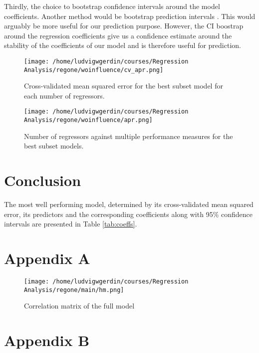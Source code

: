\documentclass[11pt]{article}
\begin{document}
Thirdly, the choice to bootstrap confidence intervals around the model coefficients. Another method 
would be bootstrap prediction intervals \cite{davison_hinkley_1997}. This 
would arguably be more useful for our prediction purpose. However, the CI boostrap around the regression 
coefficients give us a confidence estimate around the stability of the coefficients of our model and is
therefore useful for prediction.



\begin{figure}[htbp]
\centering
\texttt{[image: /home/ludvigwgerdin/courses/Regression Analysis/regone/woinfluence/cv\_apr.png]}
\caption{\label{fig:org419f46d}
Cross-validated mean squared error for the best subset model for each number of regressors.}
\end{figure}

\begin{figure}[htbp]
\centering
\texttt{[image: /home/ludvigwgerdin/courses/Regression Analysis/regone/woinfluence/apr.png]}
\caption{\label{fig:org04b25ee}
Number of regressors against multiple performance measures for the best subset models.}
\end{figure}

\newpage
\section{Conclusion}
\label{sec:org39a7cbf}

The most well performing model, determined by its cross-validated 
mean squared error, its predictors and the corresponding coefficients along with 95\% confidence intervals are 
presented in Table \ref{tab:coeffs}. 



\section{Appendix A}
\label{sec:org43ac78c}

\begin{figure}[H]
\centering
\texttt{[image: /home/ludvigwgerdin/courses/Regression Analysis/regone/main/hm.png]}
\caption{\label{fig:orgbd796ca}
Correlation matrix of the full model}
\end{figure}

\newpage

\section{Appendix B}
\label{sec:org81a6dea}
\end{document}
